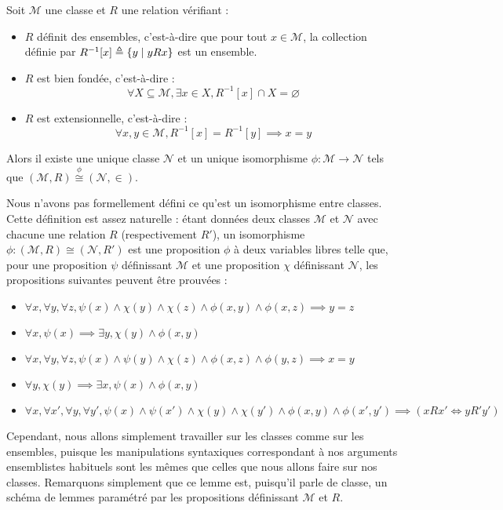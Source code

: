 \begin{lemma}\label{lem.most}
  Soit $\mathcal M$ une classe et $R$ une relation vérifiant :
  \begin{itemize}
  \item $R$ définit des ensembles, c'est-à-dire que pour tout $x\in \mathcal M$,
    la collection définie par $R^{-1}[x] \triangleq \{y\mid y R x\}$ est un
    ensemble.
  \item $R$ est bien fondée, c'est-à-dire :
    \[\forall X\subseteq \mathcal M, \exists x \in X, R^{-1}[x]\cap X =
    \varnothing\]
  \item $R$ est extensionnelle, c'est-à-dire :
    \[\forall x,y\in \mathcal M, R^{-1}[x] = R^{-1}[y] \implies x = y\]
  \end{itemize}

  Alors il existe une unique classe $\mathcal N$ et un unique isomorphisme
  $\phi : \mathcal M\to \mathcal N$ tels que
  $(\mathcal M,R) \overset{\phi}{\cong} (\mathcal N,\in)$.
\end{lemma}

\begin{remark}
  Nous n'avons pas formellement défini ce qu'est un isomorphisme entre classes.
  Cette définition est assez naturelle : étant données deux classes $\mathcal M$
  et $\mathcal N$ avec chacune une relation $R$ (respectivement $R'$), un
  isomorphisme $\phi : (\mathcal M,R)\cong (\mathcal N,R')$ est une proposition
  $\phi$ à deux variables libres telle que, pour une proposition $\psi$
  définissant $\mathcal M$ et une proposition $\chi$ définissant $\mathcal N$,
  les propositions suivantes peuvent être prouvées :
  \begin{itemize}
  \item $\forall x,\forall y,\forall z, \psi(x)\land \chi(y)\land\chi(z)\land
    \phi(x,y)\land\phi(x,z) \implies y = z$
  \item $\forall x,\psi(x)\implies \exists y, \chi(y)\land \phi(x,y)$
  \item $\forall x,\forall y,\forall z, \psi(x)\land\psi(y)\land\chi(z)\land
    \phi(x,z)\land\phi(y,z)\implies x = y$
  \item $\forall y,\chi(y)\implies \exists x, \psi(x)\land \phi(x,y)$
  \item $\forall x,\forall x',\forall y, \forall y', \psi(x)\land\psi(x')\land
    \chi(y)\land\chi(y')\land\phi(x,y)\land\phi(x',y')\implies
    (xR x'\iff yR' y')$
  \end{itemize}

  Cependant, nous allons simplement travailler sur les classes comme sur les
  ensembles, puisque les manipulations syntaxiques correspondant à nos
  arguments ensemblistes habituels sont les mêmes que celles que nous allons
  faire sur nos classes. Remarquons simplement que ce lemme est, puisqu'il parle
  de classe, un schéma de lemmes paramétré par les propositions définissant
  $\mathcal M$ et $R$.
\end{remark}

